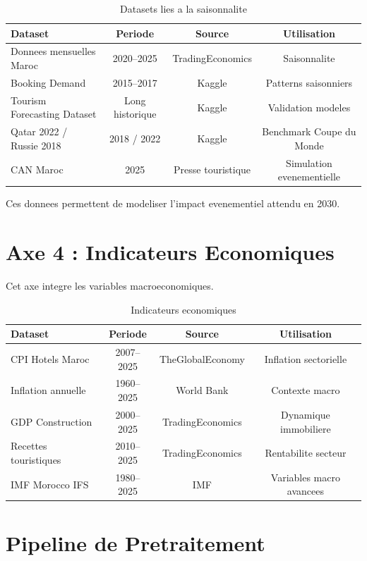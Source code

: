\documentclass[12pt,a4paper]{report}
\begin{document}
\begin{table}[H]
\centering
\small
\begin{tabular}{lccc}
\toprule
Dataset & Periode & Source & Utilisation \\
\midrule
Donnees mensuelles Maroc & 2020--2025 & TradingEconomics & Saisonnalite \\
Booking Demand & 2015--2017 & Kaggle & Patterns saisonniers \\
Tourism Forecasting Dataset & Long historique & Kaggle & Validation modeles \\
Qatar 2022 / Russie 2018 & 2018 / 2022 & Kaggle & Benchmark Coupe du Monde \\
CAN Maroc & 2025 & Presse touristique & Simulation evenementielle \\
\bottomrule
\end{tabular}
\caption{Datasets lies a la saisonnalite}
\end{table}

Ces donnees permettent de modeliser l'impact evenementiel attendu en 2030.

\section{Axe 4 : Indicateurs Economiques}

Cet axe integre les variables macroeconomiques.

\begin{table}[H]
\centering
\small
\begin{tabular}{lccc}
\toprule
Dataset & Periode & Source & Utilisation \\
\midrule
CPI Hotels Maroc & 2007--2025 & TheGlobalEconomy & Inflation sectorielle \\
Inflation annuelle & 1960--2025 & World Bank & Contexte macro \\
GDP Construction & 2000--2025 & TradingEconomics & Dynamique immobiliere \\
Recettes touristiques & 2010--2025 & TradingEconomics & Rentabilite secteur \\
IMF Morocco IFS & 1980--2025 & IMF & Variables macro avancees \\
\bottomrule
\end{tabular}
\caption{Indicateurs economiques}
\end{table}

\section{Pipeline de Pretraitement}
\end{document}

